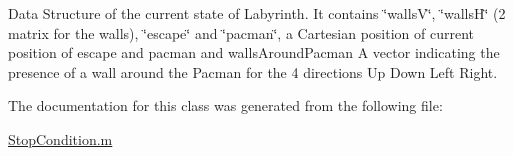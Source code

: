 Data Structure of the current state of Labyrinth. It contains \char`\"{}walls\+V\char`\"{}, \char`\"{}walls\+H\char`\"{} (2 matrix for the walls), \char`\"{}escape\char`\"{} and \char`\"{}pacman\char`\"{}, a Cartesian position of current position of escape and pacman and \textquotesingle{}walls\+Around\+Pacman\textquotesingle{} A vector indicating the presence of a wall around the Pacman for the 4 directions Up Down Left Right. 



The documentation for this class was generated from the following file\+:\begin{DoxyCompactItemize}
\item 
\hyperlink{_stop_condition_8m}{Stop\+Condition.\+m}\end{DoxyCompactItemize}
